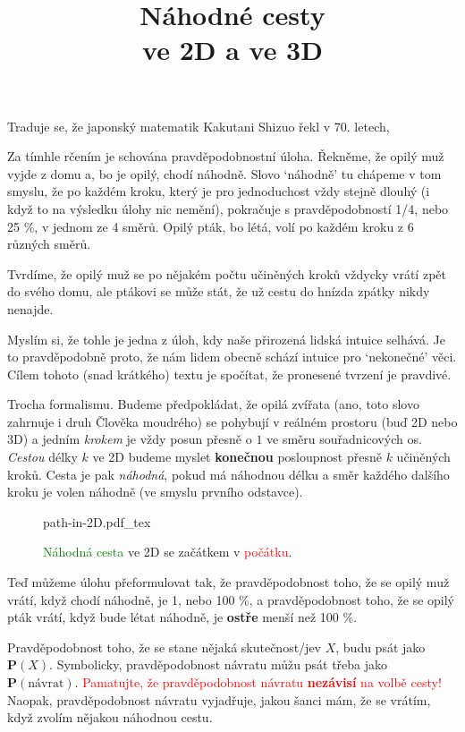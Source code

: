 \documentclass[a4paper,11pt]{article}
\title{\Huge\textsf{Náhodné cesty}\\
 \Large\textsf{ve 2D a ve 3D}
 \author{}
 \date{}
}
\theoremstyle{remark}
\renewcommand{\P}{\mathbf{P}}
\begin{document}
\maketitle
\thispagestyle{fancy}

Traduje se, že japonský matematik Kakutani Shizuo řekl v 70. letech,

\begin{center}
 \emph{}
\end{center}

Za tímhle rčením je schována pravděpodobnostní úloha. Řekněme, že opilý muž
vyjde z domu a, bo je opilý, chodí náhodně. Slovo `náhodně' tu chápeme v tom
smyslu, že po každém kroku, který je pro jednoduchost vždy stejně dlouhý (i když
to na výsledku úlohy nic nemění), pokračuje s pravděpodobností 1/4, nebo 25 \%,
v jednom ze 4 směrů. Opilý pták, bo létá, volí po každém kroku z 6 různých
směrů.

Tvrdíme, že opilý muž se po nějakém počtu učiněných kroků vždycky vrátí zpět do
svého domu, ale ptákovi se může stát, že už cestu do hnízda zpátky nikdy
nenajde.

Myslím si, že tohle je jedna z úloh, kdy naše přirozená lidská intuice selhává.
Je to pravděpodobně proto, že nám lidem obecně schází intuice pro `nekonečné'
věci. Cílem tohoto (snad krátkého) textu je spočítat, že pronesené tvrzení je
pravdivé.

Trocha formalismu. Budeme předpokládat, že opilá zvířata (ano, toto slovo
zahrnuje i druh Člověka moudrého) se pohybují v reálném prostoru (buď 2D nebo
3D) a jedním \emph{krokem} je vždy posun přesně o $1$ ve směru souřadnicových
os. \emph{Cestou} délky $k$ ve 2D budeme myslet \textbf{konečnou} posloupnost
přesně $k$ učiněných kroků. Cesta je pak \emph{náhodná}, pokud má náhodnou délku
a směr každého dalšího kroku je volen náhodně (ve smyslu prvního odstavce).

\begin{figure}[t]
 \centering
 \def\svgwidth{.5\textwidth}
 {path-in-2D.pdf_tex}
 \caption{\textcolor{green}{Náhodná cesta} ve 2D se začátkem v
 \textcolor{red}{počátku}.}
\end{figure}

Teď můžeme úlohu přeformulovat tak, že pravděpodobnost toho, že se opilý muž
vrátí, když chodí náhodně, je 1, nebo 100 \%, a pravděpodobnost toho, že se
opilý pták vrátí, když bude létat náhodně, je \textbf{ostře} menší než 100 \%.

Pravděpodobnost toho, že se stane nějaká skutečnost/jev $X$, budu psát jako
$\P(X)$. Symbolicky, pravděpodobnost návratu můžu psát třeba jako
$\P(\text{návrat})$. \textcolor{red}{Pamatujte, že pravděpodobnost návratu
\textbf{nezávisí} na volbě cesty!} Naopak, prav\-děpodobnost návratu vyjadřuje,
jakou šanci mám, že se vrátím, když zvolím nějakou náhodnou cestu.
\end{document}

